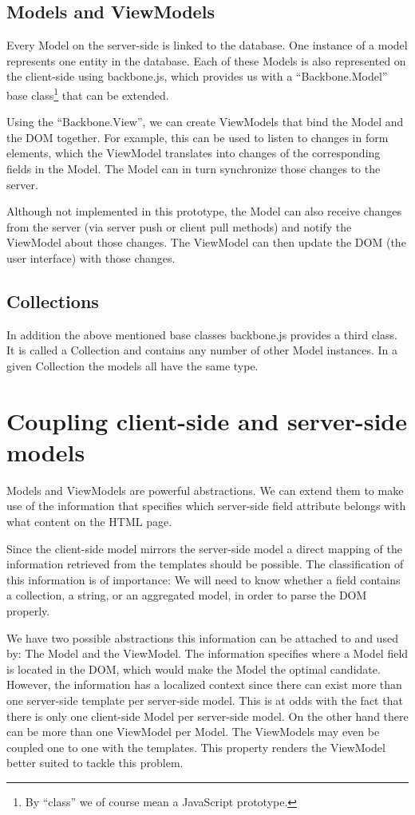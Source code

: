 \documentclass[thesis.tex]{subfiles}
\begin{document}
\subsection{Models and ViewModels}
Every Model on the server-side is linked to the database.
One instance of a model represents one entity in the database.
Each of these Models is also represented on the client-side using backbone.js,
which provides us with a ``Backbone.Model'' base class\footnote{By ``class''
we of course mean a JavaScript prototype.} that can be extended.

Using the ``Backbone.View'', we can create ViewModels that bind the Model and the
DOM together. For example, this can be used to listen to changes in
form elements, which the ViewModel translates into changes of the corresponding
fields in the Model. The Model can in turn synchronize those changes to the
server.

Although not implemented in this prototype, the Model can also receive changes
from the server (via server push or client pull methods) and notify
the ViewModel about those changes. The ViewModel can then update the
DOM (the user interface) with those changes.

\subsection{Collections}
In addition the above mentioned base classes backbone.js provides a third class.
It is called a Collection and contains any number of other Model instances.
In a given Collection the models all have the same type.

\section{Coupling client-side and server-side models}
Models and ViewModels are powerful abstractions.
We can extend them to make use of the information that specifies
which server-side field attribute belongs with what content on the HTML page.

Since the client-side model mirrors the server-side model a direct mapping of
the information retrieved from the templates should be possible.
The classification of this information is of importance: We will need to know
whether a field contains a collection, a string, or an aggregated model,
in order to parse the DOM properly.

We have two possible abstractions this information can be attached to and
used by: The Model and the ViewModel.
The information specifies where a Model field is located in the DOM, which would
make the Model the optimal candidate. However, the information has a
localized context since there can exist more than one server-side template per
server-side model.
This is at odds with the fact that there is only one client-side Model
per server-side model.
On the other hand there can be more than one ViewModel per Model.
The ViewModels may even be coupled one to one with the templates.
This property renders the ViewModel better suited to tackle this problem.
\end{document}
